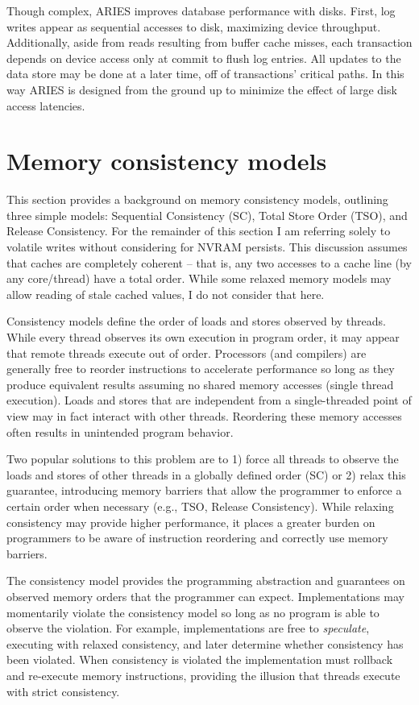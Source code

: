 Though complex, ARIES improves database performance with disks.
First, log writes appear as sequential accesses to disk, maximizing device throughput.
Additionally, aside from reads resulting from buffer cache misses, each transaction depends on device access only at commit to flush log entries.
All updates to the data store may be done at a later time, off of transactions' critical paths.
In this way ARIES is designed from the ground up to minimize the effect of large disk access latencies.

\section{Memory consistency models}
\label{sec:Background:MemoryConsistency}

This section provides a background on memory consistency models, outlining three simple models: Sequential Consistency (SC), Total Store Order (TSO), and Release Consistency.
For the remainder of this section I am referring solely to volatile writes without considering for NVRAM persists.
This discussion assumes that caches are completely coherent -- that is, any two accesses to a cache line (by any core/thread) have a total order.
While some relaxed memory models may allow reading of stale cached values, I do not consider that here.

Consistency models define the order of loads and stores observed by threads.
While every thread observes its own execution in program order, it may appear that remote threads execute out of order.
Processors (and compilers) are generally free to reorder instructions to accelerate performance so long as they produce equivalent results assuming no shared memory accesses (single thread execution).
Loads and stores that are independent from a single-threaded point of view may in fact interact with other threads.
Reordering these memory accesses often results in unintended program behavior.

Two popular solutions to this problem are to 1) force all threads to observe the loads and stores of other threads in a globally defined order (SC) or 2) relax this guarantee, introducing memory barriers that allow the programmer to enforce a certain order when necessary (e.g., TSO, Release Consistency).
While relaxing consistency may provide higher performance, it places a greater burden on programmers to be aware of instruction reordering and correctly use memory barriers.

The consistency model provides the programming abstraction and guarantees on observed memory orders that the programmer can expect.
Implementations may momentarily violate the consistency model so long as no program is able to observe the violation.
For example, implementations are free to \emph{speculate}, executing with relaxed consistency, and later determine whether consistency has been violated.
When consistency is violated the implementation must rollback and re-execute memory instructions, providing the illusion that threads execute with strict consistency.

